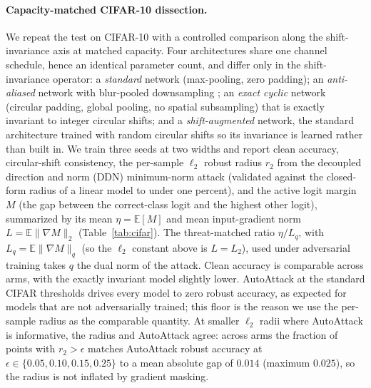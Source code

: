 \documentclass{article}
\theoremstyle{definition}
\begin{document}
\paragraph{Capacity-matched CIFAR-10 dissection.} We repeat the test on CIFAR-10 with a controlled comparison along the shift-invariance axis at matched capacity. Four architectures share one channel schedule, hence an identical parameter count, and differ only in the shift-invariance operator: a \emph{standard} network (max-pooling, zero padding); an \emph{anti-aliased} network with blur-pooled downsampling \citep{zhang2019making}; an \emph{exact cyclic} network (circular padding, global pooling, no spatial subsampling) that is exactly invariant to integer circular shifts; and a \emph{shift-augmented} network, the standard architecture trained with random circular shifts so its invariance is learned rather than built in. We train three seeds at two widths and report clean accuracy, circular-shift consistency, the per-sample $\ell_2$ robust radius $r_2$ from the decoupled direction and norm (DDN) minimum-norm attack \citep{rony2019decoupling} (validated against the closed-form radius of a linear model to under one percent), and the active logit margin $M$ (the gap between the correct-class logit and the highest other logit), summarized by its mean $\eta=\mathbb{E}[M]$ and mean input-gradient norm $L=\mathbb{E}\|\nabla M\|_2$ (Table~\ref{tab:cifar}). The threat-matched ratio $\eta/L_q$, with $L_q=\mathbb{E}\|\nabla M\|_q$ (so the $\ell_2$ constant above is $L=L_2$), used under adversarial training takes $q$ the dual norm of the attack. Clean accuracy is comparable across arms, with the exactly invariant model slightly lower. AutoAttack \citep{croce2020reliable} at the standard CIFAR thresholds drives every model to zero robust accuracy, as expected for models that are not adversarially trained; this floor is the reason we use the per-sample radius as the comparable quantity. At smaller $\ell_2$ radii where AutoAttack is informative, the radius and AutoAttack agree: across arms the fraction of points with $r_2>\epsilon$ matches AutoAttack robust accuracy at $\epsilon\in\{0.05,0.10,0.15,0.25\}$ to a mean absolute gap of $0.014$ (maximum $0.025$), so the radius is not inflated by gradient masking.
\end{document}
